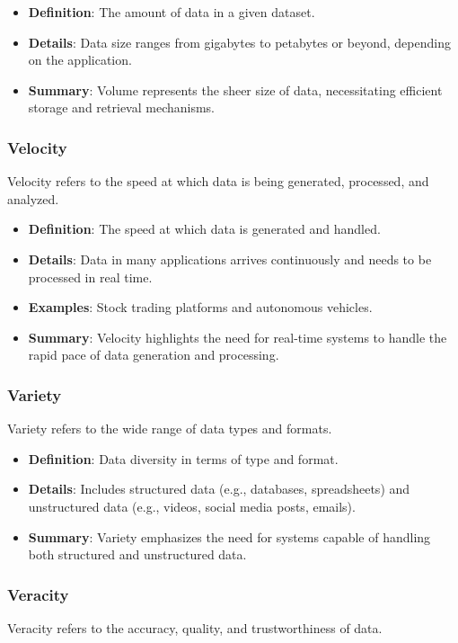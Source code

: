 \documentclass[12pt]{article}
\begin{document}
\begin{itemize}
    \item \textbf{Definition}: The amount of data in a given dataset.
    \item \textbf{Details}: Data size ranges from gigabytes to petabytes or beyond, depending on the application.
    \item \textbf{Summary}: Volume represents the sheer size of data, necessitating efficient storage and retrieval mechanisms.
\end{itemize}

\subsubsection{Velocity}
Velocity refers to the speed at which data is being generated, processed, and analyzed.

\begin{itemize}
    \item \textbf{Definition}: The speed at which data is generated and handled.
    \item \textbf{Details}: Data in many applications arrives continuously and needs to be processed in real time.
    \item \textbf{Examples}: Stock trading platforms and autonomous vehicles.
    \item \textbf{Summary}: Velocity highlights the need for real-time systems to handle the rapid pace of data generation and processing.
\end{itemize}

\subsubsection{Variety}
Variety refers to the wide range of data types and formats.

\begin{itemize}
    \item \textbf{Definition}: Data diversity in terms of type and format.
    \item \textbf{Details}: Includes structured data (e.g., databases, spreadsheets) and unstructured data (e.g., videos, social media posts, emails).
    \item \textbf{Summary}: Variety emphasizes the need for systems capable of handling both structured and unstructured data.
\end{itemize}

\subsubsection{Veracity}
Veracity refers to the accuracy, quality, and trustworthiness of data.
\end{document}
